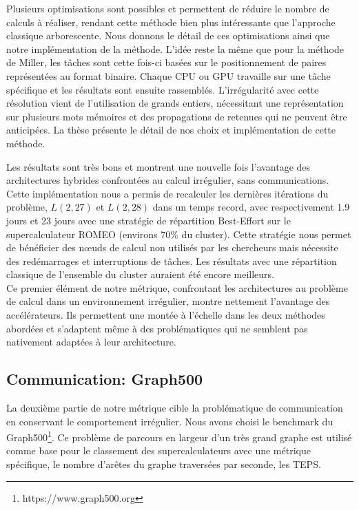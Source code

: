 \documentclass[12pt,a4paper]{report}
\begin{document}
Plusieurs optimisations sont possibles et permettent de réduire le nombre de calculs à réaliser, rendant cette méthode bien plus intéressante que l'approche classique arborescente. 
Nous donnons le détail de ces optimisations ainsi que notre implémentation de la méthode. 
L'idée reste la même que pour la méthode de Miller, les tâches sont cette fois-ci basées sur le positionnement de paires représentées au format binaire.
Chaque CPU ou GPU travaille sur une tâche spécifique et les résultats sont ensuite rassemblés. 
L'irrégularité avec cette résolution vient de l'utilisation de grands entiers, nécessitant une représentation sur plusieurs mots mémoires et des propagations de retenues qui ne peuvent être anticipées. 
La thèse présente le détail de nos choix et implémentation de cette méthode. 

Les résultats sont très bons et montrent une nouvelle fois l'avantage des architectures hybrides confrontées au calcul irrégulier, sans communications. 
Cette implémentation nous a permis de recalculer les dernières itérations du problème, $L(2,27)$ et $L(2,28)$ dans un temps record, avec respectivement 1.9 jours et 23 jours avec une stratégie de répartition Best-Effort sur le supercalculateur ROMEO (environs 70\% du cluster). 
Cette stratégie nous permet de bénéficier des nœuds de calcul non utilisés par les chercheurs mais nécessite des redémarrages et interruptions de tâches. 
Les résultats avec une répartition classique de l'ensemble du cluster auraient été encore meilleurs.\\ 

Ce premier élément de notre métrique, confrontant les architectures au problème de calcul dans un environnement irrégulier, montre nettement l'avantage des accélérateurs. 
Ils permettent une montée à l'échelle dans les deux méthodes abordées et s'adaptent même à des problématiques qui ne semblent pas nativement adaptées à leur architecture. 

\subsection{Communication: Graph500}
La deuxième partie de notre métrique cible la problématique de communication en conservant le comportement irrégulier. 
Nous avons choisi le benchmark du Graph500\footnote{https://www.graph500.org}. 
Ce problème de parcours en largeur d'un très grand graphe est utilisé comme base pour le classement des supercalculateurs avec une métrique spécifique, le nombre d'arêtes du graphe traversées par seconde, les TEPS. 
\end{document}
